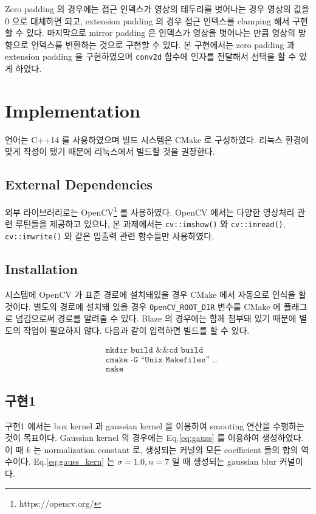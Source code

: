 \documentclass[a4paper, 12p]{paper}
\def\code#1{\texttt{#1}}
\begin{document}
 Zero padding 의 경우에는 접근 인덱스가 영상의 테두리를 벗어나는 경우 영상의 값을 0 으로 대체하면 되고, extension padding 의 경우 접근 인덱스를 clamping 해서 구현할 수 있다. 마지막으로 mirror padding 은 인덱스가 영상을 벗어나는 만큼 영상의 방향으로 인덱스를 변환하는 것으로 구현할 수 있다. 본 구현에서는 zero padding 과 extension padding 을 구현하였으며 \code{conv2d} 함수에 인자를 전달해서 선택을 할 수 있게 하였다.

\section{Implementation}
언어는 C++14 를 사용하였으며 빌드 시스템은 CMake 로 구성하였다. 리눅스 환경에 맞게 작성이 됐기 때문에 리눅스에서 빌드할 것을 권장한다.

\subsection{External Dependencies}
외부 라이브러리로는 OpenCV\footnote{https://opencv.org/} 를 사용하였다. OpenCV 에서는 다양한 영상처리 관련 루틴들을 제공하고 있으나, 본 과제에서는 \code{cv::imshow()} 와 \code{cv::imread()}, \code{cv::imwrite()} 와 같은 입출력 관련 함수들만 사용하였다.

\subsection{Installation}
시스템에 OpenCV 가 표준 경로에 설치돼있을 경우 CMake 에서 자동으로 인식을 할 것이다. 별도의 경로에 설치돼 있을 경우 \code{OpenCV\_ROOT\_DIR} 변수를 CMake 에 플래그로 넘김으로써 경로를 알려줄 수 있다. Blaze 의 경우에는 함께 첨부돼 있기 때문에 별도의 작업이 필요하지 않다. 다음과 같이 입력하면 빌드를 할 수 있다. 

\begin{align*}
  & \code{mkdir build \&\& cd build} \\
  & \code{cmake -G ``Unix Makefiles'' ..} \\
  & \code{make}
\end{align*}

\subsection{구현1}
구현1 에서는 box kernel 과 gaussian kernel 을 이용하여 smooting 연산을 수행하는 것이 목표이다. Gaussian kernel 의 경우에는 Eq.\ref{eq:gauss} 를 이용하여 생성하였다. 이 때 $k$ 는 normalization constant 로, 생성되는 커널의 모든 coefficient 들의 합의 역수이다. Eq.\ref{eq:gauss_kern} 는 $\sigma = 1.0, n = 7$ 일 때 생성되는 gaussian blur 커널이다.
\end{document}
